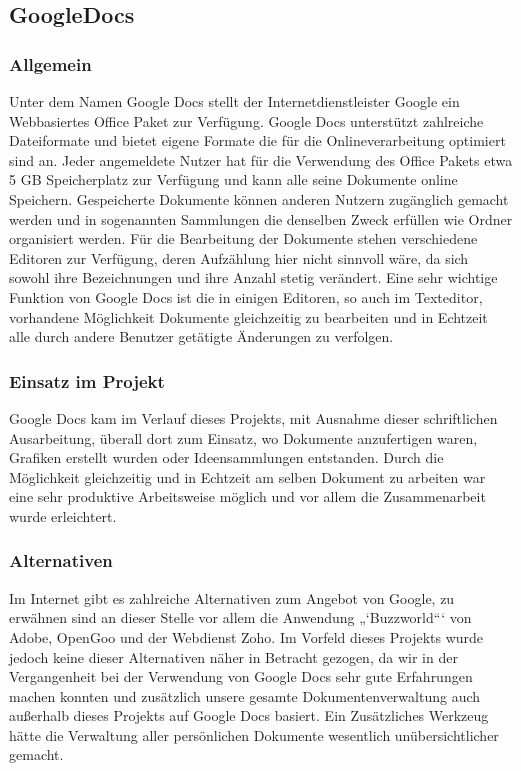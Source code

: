 \subsection{GoogleDocs}
\subsubsection{Allgemein}
Unter dem Namen Google Docs stellt der Internetdienstleister Google ein Webbasiertes Office Paket zur Verfügung. Google Docs unterstützt zahlreiche Dateiformate und bietet eigene Formate die für die Onlineverarbeitung optimiert sind an. Jeder angemeldete Nutzer hat für die Verwendung des Office Pakets etwa 5 GB Speicherplatz zur Verfügung und kann alle seine Dokumente online Speichern. 
Gespeicherte Dokumente können anderen Nutzern zugänglich gemacht werden und in sogenannten Sammlungen die denselben Zweck erfüllen wie Ordner organisiert werden.
Für die Bearbeitung der Dokumente stehen verschiedene Editoren zur Verfügung, deren Aufzählung hier nicht sinnvoll wäre, da sich sowohl ihre Bezeichnungen und ihre Anzahl stetig verändert.
Eine sehr wichtige Funktion von Google Docs ist die in einigen Editoren, so auch im Texteditor, vorhandene Möglichkeit Dokumente gleichzeitig zu bearbeiten und in Echtzeit alle durch andere Benutzer getätigte Änderungen zu verfolgen.
\subsubsection{Einsatz im Projekt}
Google Docs kam im Verlauf dieses Projekts, mit Ausnahme dieser schriftlichen Ausarbeitung, überall dort zum Einsatz, wo Dokumente anzufertigen waren, Grafiken erstellt wurden oder Ideensammlungen entstanden. Durch die Möglichkeit gleichzeitig und in Echtzeit am selben Dokument zu arbeiten war eine sehr produktive Arbeitsweise möglich und vor allem die Zusammenarbeit wurde erleichtert.  
\subsubsection{Alternativen}
Im Internet gibt es zahlreiche Alternativen zum Angebot von Google, zu erwähnen sind an dieser Stelle vor allem die Anwendung  „‘Buzzworld“‘ von Adobe, OpenGoo und der Webdienst Zoho. Im Vorfeld dieses Projekts wurde jedoch keine dieser Alternativen näher in Betracht gezogen, da wir in der Vergangenheit bei der Verwendung von Google Docs sehr gute Erfahrungen machen konnten und zusätzlich unsere gesamte Dokumentenverwaltung auch außerhalb dieses Projekts auf Google Docs basiert. Ein Zusätzliches Werkzeug hätte die Verwaltung aller persönlichen Dokumente wesentlich unübersichtlicher gemacht.
